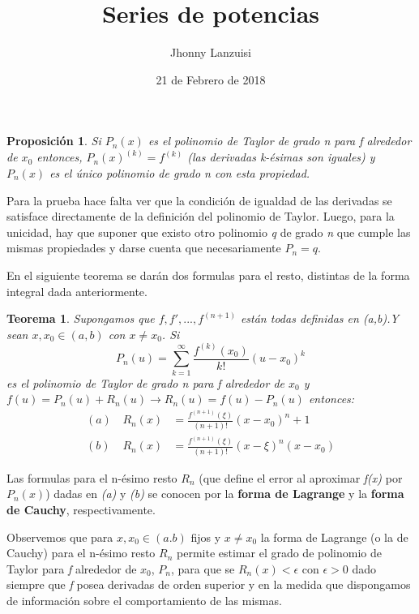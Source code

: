 \documentclass[12pt,a4paper]{article}
\title{Series de potencias}
\author{Jhonny Lanzuisi}
\date{21 de Febrero de 2018}
\newtheorem{mydef}{Teorema}
\newtheorem*{mydef3}{Proposición}
\begin{document}
\maketitle

\begin{mydef3}
	Si \( P_n(x) \) es el polinomio de Taylor de grado n para f alrededor de \(x_0\) entonces, \(P_n(x)^{(k)} = f^{(k)}\) (las derivadas k-ésimas son iguales) y \(P_n(x)\) es el único polinomio de grado n con esta propiedad.
\end{mydef3}

Para la prueba hace falta ver que la condición de igualdad de las derivadas se satisface directamente de la definición del polinomio de Taylor. Luego, para la unicidad, hay que suponer que existo otro polinomio \textit{q} de grado \textit{n} que cumple las mismas propiedades y darse cuenta que necesariamente \(P_n = q\).

En el siguiente teorema se darán dos formulas para el resto, distintas de la forma integral dada anteriormente.

\begin{mydef}
	Supongamos que \( f,f',...,f^{(n+1)} \) están todas definidas en (a,b).Y sean \( x,x_0 \in (a,b) \) con \(x \neq x_0 \). Si
		\begin{equation}
		P_n(u) = \sum_{k=1}^{\infty} \frac{f^{(k)}(x_0)}{k!} (u-x_0)^k
		\end{equation}
	es el polinomio de Taylor de grado n para f alrededor de \(x_0\) y \( f(u) = P_n(u) + R_n(u) \rightarrow R_n(u) = f(u) - P_n(u) \) entonces:
	\begin{eqnarray}
	(a) & \, R_n(x) &= \frac{f^{(n+1)}(\xi)}{(n+1)!} (x-x_0)^n+1 \\
	(b) & \, R_n(x) &= \frac{f^{(n+1)}(\xi)}{(n+1)!} (x-\xi)^n (x-x_0)
	\end{eqnarray}
\end{mydef}

Las formulas para el n-ésimo resto \(R_n\) (que define el error al aproximar \textit{f(x)} por \(P_n(x)\)) dadas en \textit{(a)} y \textit{(b)} se conocen por la \textbf{forma de Lagrange} y la \textbf{forma de Cauchy}, respectivamente.

Observemos que para \(x,x_0 \in (a.b) \) fijos y \(x \neq x_0\) la forma de Lagrange (o la de Cauchy) para el n-ésimo resto \(R_n\) permite estimar el grado de polinomio de Taylor para \textit{f} alrededor de \(x_0\), \(P_n\), para que se \(R_n(x) < \epsilon \) con \( \epsilon > 0 \) dado siempre que \textit{f} posea derivadas de orden superior y en la medida que dispongamos de información sobre el comportamiento de las mismas. 
\end{document}

